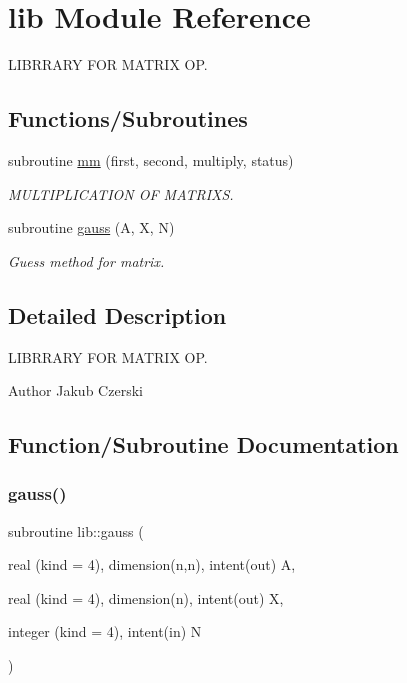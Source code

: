 \hypertarget{namespacelib}{}\section{lib Module Reference}
\label{namespacelib}


L\+I\+B\+R\+R\+A\+RY F\+OR M\+A\+T\+R\+IX OP.  


\subsection*{Functions/\+Subroutines}
\begin{DoxyCompactItemize}
\item 
subroutine \mbox{\hyperlink{namespacelib_ae69dd109662f22ec6b656d631e346dd2}{mm}} (first, second, multiply, status)
\begin{DoxyCompactList}\small\item\em M\+U\+L\+T\+I\+P\+L\+I\+C\+A\+T\+I\+ON OF M\+A\+T\+R\+I\+XS. \end{DoxyCompactList}\item 
subroutine \mbox{\hyperlink{namespacelib_ad76b66d588fa7482caf01bbd755d2a7a}{gauss}} (A, X, N)
\begin{DoxyCompactList}\small\item\em Guess method for matrix. \end{DoxyCompactList}\end{DoxyCompactItemize}


\subsection{Detailed Description}
L\+I\+B\+R\+R\+A\+RY F\+OR M\+A\+T\+R\+IX OP. 

\begin{DoxyAuthor}{Author}
Jakub Czerski 
\end{DoxyAuthor}


\subsection{Function/\+Subroutine Documentation}
\mbox{\label{namespacelib_ad76b66d588fa7482caf01bbd755d2a7a}} 
\subsubsection{\texorpdfstring{gauss()}{gauss()}}
{\footnotesize\ttfamily subroutine lib\+::gauss (\begin{DoxyParamCaption}\item[{real (kind = 4), dimension(n,n), intent(out)}]{A,  }\item[{real (kind = 4), dimension(n), intent(out)}]{X,  }\item[{integer (kind = 4), intent(in)}]{N }\end{DoxyParamCaption})}



